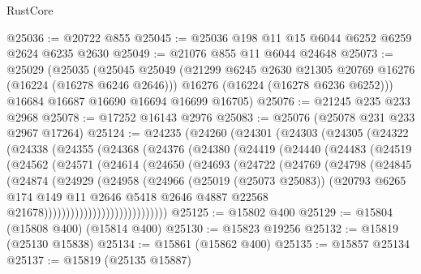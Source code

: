\begin{lexlean}{RustCore}
\begin{coremodule}
@25036 := @20722 @855
@25045 := @25036 @198 @11 @15 @6044 @6252 @6259 @2624 @6235 @2630
@25049 := @21076 @855 @11 @6044 @24648
@25073 := @25029
    (@25035
      (@25045
        @25049
        (@21299 @6245 @2630 @21305 @20769 @16276 (@16224 (@16278 @6246 @2646)))
        @16276
        (@16224 (@16278 @6236 @6252)))
      @16684
      @16687
      @16690
      @16694
      @16699
      @16705)
@25076 := @21245 @235 @233 @2968
@25078 := @17252 @16143 @2976
@25083 := @25076 (@25078 @231 @233 @2967 @17264)
@25124 := @24235
    (@24260
      (@24301
        (@24303
          (@24305
            (@24322
              (@24338
                (@24355
                  (@24368
                    (@24376
                      (@24380
                        (@24419
                          (@24440
                            (@24483
                              (@24519
                                (@24562
                                  (@24571
                                    (@24614
                                      (@24650
                                        (@24693
                                          (@24722
                                            (@24769
                                              (@24798
                                                (@24845
                                                  (@24874
                                                    (@24929
                                                      (@24958
                                                        (@24966
                                                          (@25019 (@25073 @25083))
                                                          (@20793
                                                            @6265
                                                            @174
                                                            @149
                                                            @11
                                                            @2646
                                                            @5418
                                                            @2646
                                                            @4887
                                                            @22568
                                                            @21678))))))))))))))))))))))))))))
@25125 := @15802 @400
@25129 := @15804 (@15808 @400) (@15814 @400)
@25130 := @15823 @19256
@25132 := @15819 (@25130 @15838)
@25134 := @15861 (@15862 @400)
@25135 := @15857 @25134
@25137 := @15819 (@25135 @15887)

\end{coremodule}
\end{lexlean}
